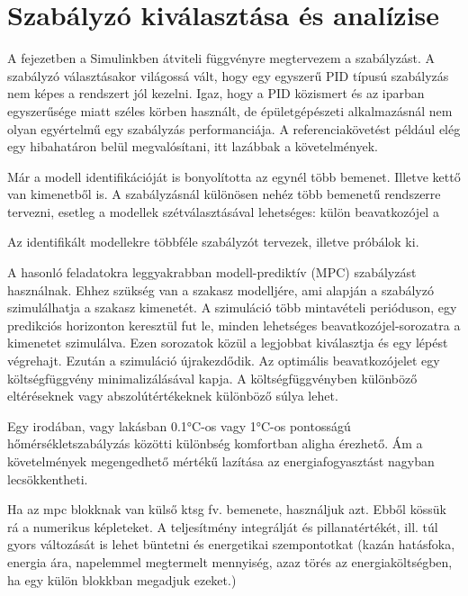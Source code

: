 \chapter{Szabályzó kiválasztása és analízise}\label{chap:control}

A fejezetben a Simulinkben átviteli függvényre megtervezem a szabályzást. A szabályzó választásakor világossá vált, hogy egy egyszerű PID típusú szabályzás nem képes a rendszert jól kezelni. Igaz, hogy a PID közismert és az iparban egyszerűsége miatt széles körben használt, de épületgépészeti alkalmazásnál nem olyan egyértelmű egy szabályzás performanciája. A referenciakövetést például elég egy hibahatáron belül megvalósítani, itt lazábbak a követelmények.


Már a modell identifikációját is bonyolította az egynél több bemenet. Illetve kettő van kimenetből is. A szabályzásnál különösen nehéz több bemenetű rendszerre tervezni, esetleg a modellek szétválasztásával lehetséges: külön beavatkozójel a 


Az identifikált modellekre többféle szabályzót tervezek, illetve próbálok ki.

A hasonló feladatokra leggyakrabban modell-prediktív (MPC) szabályzást használnak\cite{AFRAM2014343}. Ehhez szükség van a szakasz modelljére, ami alapján a szabályzó szimulálhatja a szakasz kimenetét. A szimuláció több mintavételi perióduson, egy predikciós horizonton keresztül fut le, minden lehetséges  beavatkozójel-sorozatra a kimenetet szimulálva.
Ezen sorozatok közül a legjobbat kiválasztja és egy lépést végrehajt. Ezután a szimuláció újrakezdődik. Az optimális beavatkozójelet egy költségfüggvény minimalizálásával kapja. A költségfüggvényben különböző eltéréseknek vagy abszolútértékeknek különböző súlya lehet.

Egy irodában, vagy lakásban 0.1\si{\celsius}-os vagy 1\si{\celsius}-os pontosságú hőmérsékletszabályzás közötti különbség komfortban aligha érezhető. Ám a követelmények megengedhető mértékű lazítása az energiafogyasztást nagyban lecsökkentheti.

\begin{formal}
	Ha az mpc blokknak van külső ktsg fv. bemenete, használjuk azt. Ebből kössük rá a numerikus képleteket. A teljesítmény integrálját és pillanatértékét, ill. túl gyors változását is lehet büntetni és energetikai szempontotkat (kazán hatásfoka, energia ára, napelemmel megtermelt mennyiség, azaz törés az energiaköltségben, ha egy külön blokkban megadjuk ezeket.)
\end{formal}

